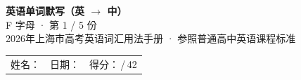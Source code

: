 \documentclass[10pt,a4paper]{article}
\begin{document}
\pagestyle{plain}

\begin{center}
{\LARGE\bfseries 英语单词默写（英 $\to$ 中）}\\[0.22em]
{\large F 字母 · 第 1 / 5 份}\\[0.18em]
{\small 2026年上海市高考英语词汇用法手册 · 参照普通高中英语课程标准}
\end{center}

\vspace{0.25em}
\noindent\begin{tabular}{@{}p{}@{}p{}@{}p{}@{}}
姓名：\underline{\hspace{2.0cm}} & 日期：\underline{\hspace{2.0cm}} & 得分：\underline{\hspace{1.3cm}}\,/\,42 \\
\end{tabular}

\vspace{0.3em}

\vspace{0.08em}
\end{document}
